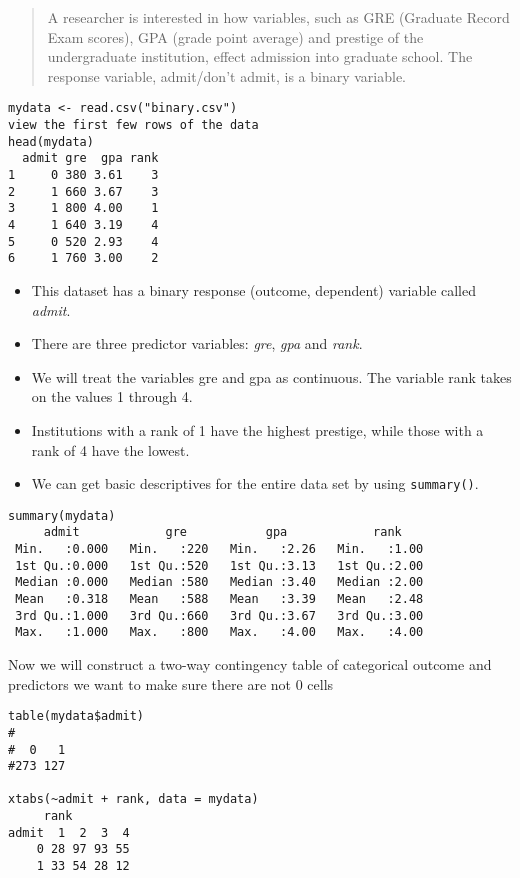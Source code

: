 \begin{quote}
A researcher is interested in how variables, such as GRE (Graduate Record Exam scores), GPA (grade point average) and prestige of the undergraduate institution, effect admission into graduate school. The response variable, admit/don't admit, is a binary variable.
\end{quote}
{
\large
\begin{framed}
\begin{verbatim}
mydata <- read.csv("binary.csv")
view the first few rows of the data
head(mydata)
  admit gre  gpa rank
1     0 380 3.61    3
2     1 660 3.67    3
3     1 800 4.00    1
4     1 640 3.19    4
5     0 520 2.93    4
6     1 760 3.00    2
\end{verbatim}
\end{framed}
}
\begin{itemize}
\item This dataset has a binary response (outcome, dependent) variable called \textit{admit}.
\item There are three predictor variables: \textit{gre}, \textit{gpa} and \textit{rank}. 
\item We will treat the variables gre and gpa as continuous. The variable rank takes on the values 1 through 4. 
\item Institutions with a rank of 1 have the highest prestige, while those with a rank of 4 have the lowest.
\item We can get basic descriptives for the entire data set by using \texttt{summary()}. 
\end{itemize}
\begin{framed}
\begin{verbatim}
summary(mydata)
     admit            gre           gpa            rank     
 Min.   :0.000   Min.   :220   Min.   :2.26   Min.   :1.00  
 1st Qu.:0.000   1st Qu.:520   1st Qu.:3.13   1st Qu.:2.00  
 Median :0.000   Median :580   Median :3.40   Median :2.00  
 Mean   :0.318   Mean   :588   Mean   :3.39   Mean   :2.48  
 3rd Qu.:1.000   3rd Qu.:660   3rd Qu.:3.67   3rd Qu.:3.00  
 Max.   :1.000   Max.   :800   Max.   :4.00   Max.   :4.00
\end{verbatim}
\end{framed}

\begin{framed}
Now we will construct a two-way contingency table of categorical outcome and predictors we want to make sure there are not 0 cells
\begin{verbatim}
table(mydata$admit)
#
#  0   1 
#273 127 

xtabs(~admit + rank, data = mydata)
     rank
admit  1  2  3  4
    0 28 97 93 55
    1 33 54 28 12
\end{verbatim}
\end{framed}
